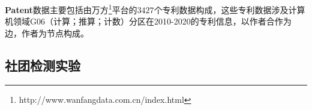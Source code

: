 \textbf{Patent}数据主要包括由万方\footnote{ http://www.wanfangdata.com.cn/index.html}平台的$3427$个专利数据构成，这些专利数据涉及计算机领域G06（计算；推算；计数）分区在2010-2020的专利信息，以作者合作为边，作者为节点构成。

\subsection{社团检测实验}



